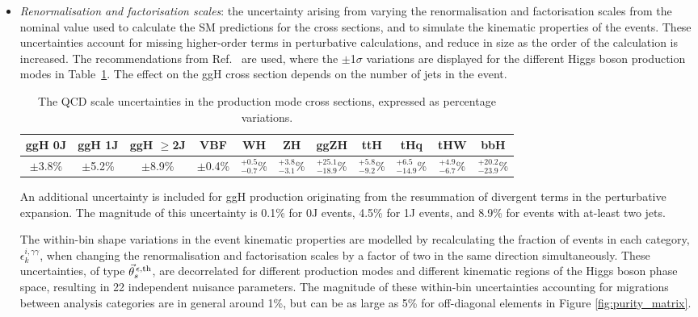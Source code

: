 \begin{itemize}
    \item \textit{Renormalisation and factorisation scales}: the uncertainty arising from varying the renormalisation and factorisation scales from the nominal value used to calculate the SM predictions for the cross sections, and to simulate the kinematic properties of the events. These uncertainties account for missing higher-order terms in perturbative calculations, and reduce in size as the order of the calculation is increased. The recommendations from Ref.~\cite{deFlorian:2016spz} are used, where the $\pm$1$\sigma$ variations are displayed for the different Higgs boson production modes in Table~\ref{tab:qcdscale_variation}. The effect on the ggH cross section depends on the number of jets in the event.
    
    \begin{table}
        \caption[QCD scale uncertainties in production mode cross sections]{The QCD scale uncertainties in the production mode cross sections, expressed as percentage variations.}
        \label{tab:qcdscale_variation}
        \centering
        \footnotesize
        \setlength{\tabcolsep}{3pt}
        \renewcommand{\arraystretch}{2}
        \begin{tabular}{c|c|c|c|c|c|c|c|c|c|c}
            \hline
            ggH 0J & ggH 1J & ggH $\geq$2J & VBF & WH & ZH & ggZH & ttH & tHq & tHW & bbH   \\ \hline
            $\pm$3.8\%  & $\pm$5.2\%  & $\pm$8.9\% & $\pm$0.4\% & $^{+0.5}_{-0.7}$\% & $^{+3.8}_{-3.1}$\%  & $^{+25.1}_{-18.9}$\% & $^{+5.8}_{-9.2}$\% & $^{+6.5}_{-14.9}$\% & $^{+4.9}_{-6.7}$\% & $^{+20.2}_{-23.9}$\% \\ 
            \hline
        \end{tabular}
    \end{table}

    \noindent
    An additional uncertainty is included for ggH production originating from the resummation of divergent terms in the perturbative expansion. The magnitude of this uncertainty is 0.1\% for 0J events, 4.5\% for 1J events, and 8.9\% for events with at-least two jets.
    
    The within-bin shape variations in the event kinematic properties are modelled by recalculating the fraction of events in each category, $\epsilon^{i,\gamma\gamma}_{k}$, when changing the renormalisation and factorisation scales by a factor of two in the same direction simultaneously. These uncertainties, of type $\vec{\theta}^{\,\epsilon,{\rm{th}}}_{s}$, are decorrelated for different production modes and different kinematic regions of the Higgs boson phase space, resulting in 22 independent nuisance parameters. The magnitude of these within-bin uncertainties accounting for migrations between analysis categories are in general around 1\%, but can be as large as 5\% for off-diagonal elements in Figure \ref{fig:purity_matrix}.
    

\end{itemize}
